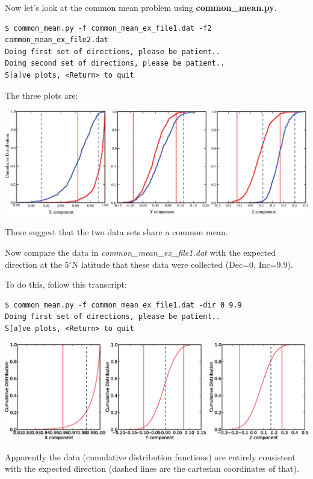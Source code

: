 \documentclass[11pt]{book}
\begin{document}
{{Now let's look at the common mean problem using {\bf common\_mean.py}.

\begin{verbatim}
$ common_mean.py -f common_mean_ex_file1.dat -f2 common_mean_ex_file2.dat
Doing first set of directions, please be patient..
Doing second set of directions, please be patient..
S[a]ve plots, <Return> to quit
\end{verbatim}

\noindent The three plots are:

{ %
  \includegraphics[width=15cm]{EPSfiles/common-mean.eps}}

These suggest that  the two data sets share a common mean.

Now compare the data in  {\it common\_mean\_ex\_file1.dat }  with the expected direction at the 5$^{\circ}$N latitude that these data were collected (Dec=0, Inc=9.9).

To do this,  follow this transcript:

\begin{verbatim}
$ common_mean.py -f common_mean_ex_file1.dat -dir 0 9.9
Doing first set of directions, please be patient..
S[a]ve plots, <Return> to quit
\end{verbatim}

{%
  \includegraphics[width=15cm]{EPSfiles/common-mean-EX.eps}}

Apparently the data (cumulative distribution functions) are entirely consistent with the expected direction (dashed lines are the cartesian coordinates of that).

}}
\end{document}
